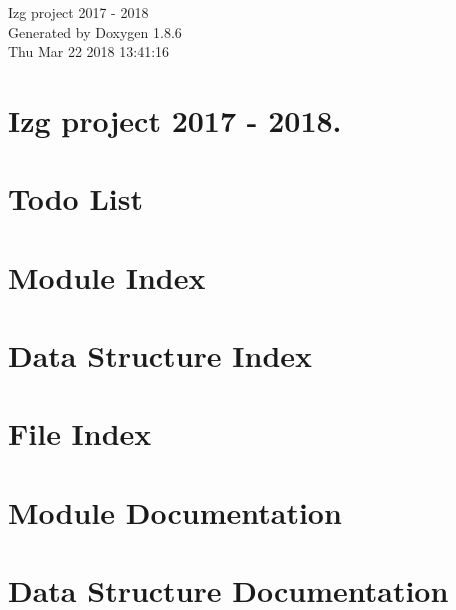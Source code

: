 \documentclass[twoside]{book}
\newcommand{\clearemptydoublepage}{%
  \newpage{\pagestyle{empty}\cleardoublepage}%
}
\begin{document}
\hypersetup{pageanchor=false}
\begin{titlepage}
\vspace*{7cm}
\begin{center}%
{\Large Izg project 2017 -\/ 2018 }\\
\vspace*{1cm}
{\large Generated by Doxygen 1.8.6}\\
\vspace*{0.5cm}
{\small Thu Mar 22 2018 13:41:16}\\
\end{center}
\end{titlepage}
\clearemptydoublepage
\tableofcontents
\clearemptydoublepage
{}
\hypersetup{pageanchor=true}

\chapter{Izg project 2017 -\/ 2018.}
\label{index}\hypertarget{index}{}
\chapter{Todo List}
\label{todo}
\hypertarget{todo}{}

\chapter{Module Index}

\chapter{Data Structure Index}

\chapter{File Index}

\chapter{Module Documentation}



\chapter{Data Structure Documentation}


















\end{document}
